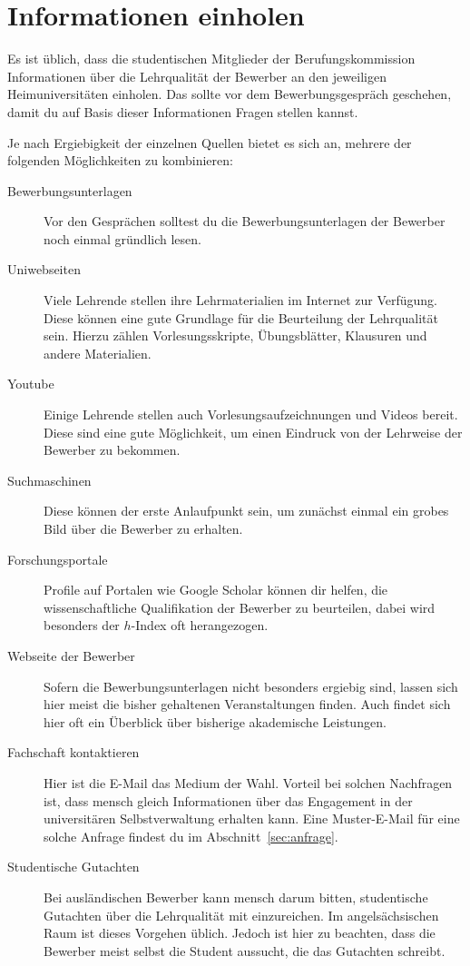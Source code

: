 \section{Informationen einholen}
Es ist üblich, dass die studentischen Mitglieder der Berufungskommission Informationen über die Lehrqualität der Bewerber an den jeweiligen Heimuniversitäten einholen.
Das sollte vor dem Bewerbungsgespräch geschehen, damit du auf Basis dieser Informationen Fragen stellen kannst.

Je nach Ergiebigkeit der einzelnen Quellen bietet es sich an, mehrere der folgenden Möglichkeiten zu kombinieren:
\begin{description}
      \item [Bewerbungsunterlagen]
            Vor den Gesprächen solltest du die Bewerbungsunterlagen der Bewerber noch einmal gründlich lesen.
      \item [Uniwebseiten]
            Viele Lehrende stellen ihre Lehrmaterialien im Internet zur Verfügung. Diese können eine gute Grundlage für die Beurteilung der Lehrqualität sein. Hierzu zählen Vorlesungsskripte, Übungsblätter, Klausuren und andere Materialien.
      \item [Youtube]
            Einige Lehrende stellen auch Vorlesungsaufzeichnungen und Videos bereit. Diese sind eine gute Möglichkeit, um einen Eindruck von der Lehrweise der Bewerber zu bekommen.
      \item [Suchmaschinen]
            Diese können der erste Anlaufpunkt sein, um zunächst einmal ein grobes Bild über die Bewerber zu erhalten.
      \item [Forschungsportale]
            Profile auf Portalen wie Google Scholar können dir helfen, die wissenschaftliche Qualifikation der Bewerber zu beurteilen, dabei wird besonders der $h$-Index oft herangezogen.
      \item [Webseite der Bewerber]
            Sofern die Bewerbungsunterlagen nicht besonders ergiebig sind, lassen sich hier meist die bisher gehaltenen Veranstaltungen finden. Auch findet sich hier oft ein Überblick über bisherige akademische Leistungen.
      \item [Fachschaft kontaktieren]
            Hier ist die E-Mail das Medium der Wahl. Vorteil bei solchen Nachfragen ist, dass mensch gleich Informationen über das Engagement in der universitären Selbstverwaltung erhalten kann. Eine Muster-E-Mail für eine solche Anfrage findest du im Abschnitt~\ref{sec:anfrage}.
      \item [Studentische Gutachten]
            Bei ausländischen Bewerber kann mensch darum bitten, studentische Gutachten über die Lehrqualität mit einzureichen. Im angelsächsischen Raum ist dieses Vorgehen üblich. Jedoch ist hier zu beachten, dass die Bewerber meist selbst die Student aussucht, die das Gutachten schreibt.
\end{description}

